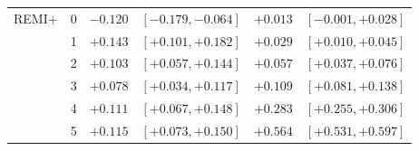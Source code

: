 \begin{table}[!t]
\begin{tabular}{@{}llrrrr@{}}
\addlinespace[2pt]
REMI+ & 0 & $-0.120$ & $[-0.179, -0.064]$ & $+0.013$ & $[-0.001, +0.028]$ \\
 & 1 & $+0.143$ & $[+0.101, +0.182]$ & $+0.029$ & $[+0.010, +0.045]$ \\
 & 2 & $+0.103$ & $[+0.057, +0.144]$ & $+0.057$ & $[+0.037, +0.076]$ \\
 & 3 & $+0.078$ & $[+0.034, +0.117]$ & $+0.109$ & $[+0.081, +0.138]$ \\
 & 4 & $+0.111$ & $[+0.067, +0.148]$ & $+0.283$ & $[+0.255, +0.306]$ \\
 & 5 & $+0.115$ & $[+0.073, +0.150]$ & $+0.564$ & $[+0.531, +0.597]$ \\
\bottomrule
\end{tabular}
\end{table}
